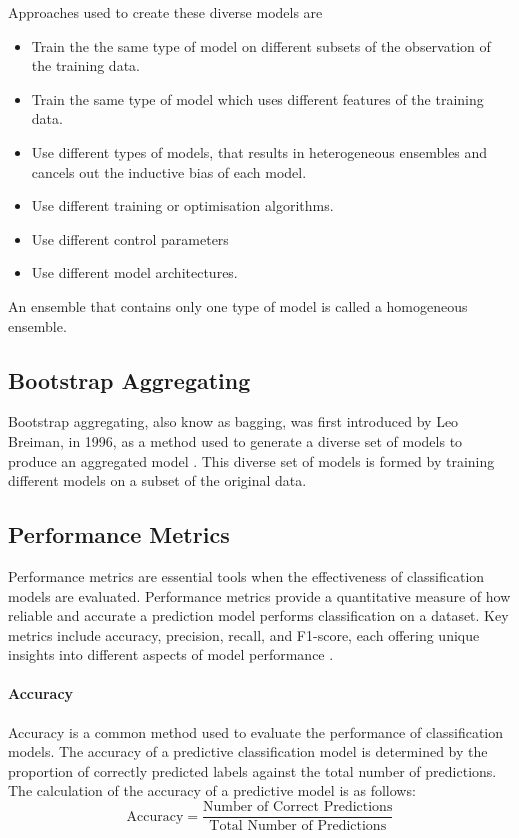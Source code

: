 \documentclass[10pt, conference]{IEEEtran}
\begin{document}
Approaches used to create these diverse models are
\begin{itemize}
    \item Train the the same type of model on different subsets of the observation of the training data.
    \item Train the same type of model which uses different features of the training data.
    \item Use different types of models, that results in heterogeneous ensembles and cancels out the inductive bias of each model.
    \item Use different training or optimisation algorithms.
    \item Use different control parameters
    \item Use different model architectures.
\end{itemize}
An ensemble that contains only one type of model is called a homogeneous ensemble.

\subsection{Bootstrap Aggregating}

Bootstrap aggregating, also know as bagging, was first introduced by Leo Breiman, in 1996, as a method
used to generate a diverse set of models to produce an aggregated model \cite{Bagging_ref}. This diverse
set of models is formed by training different models on a subset of the original data.

\subsection{Performance Metrics} \label{section: Perf_Metrics_background}

Performance metrics are essential tools when the effectiveness of classification models are evaluated. Performance metrics
provide a quantitative measure of how reliable and accurate a prediction model performs classification on a dataset.
Key metrics include accuracy, precision, recall, and F1-score, each offering unique insights into different aspects
of model performance \cite{Performance_ref}.

\paragraph{Accuracy}
Accuracy is a common method used to evaluate the performance of classification models. The accuracy of
a predictive classification model is determined by the proportion of correctly predicted labels against
the total number of predictions. The calculation of the accuracy of a predictive model is as follows:
\begin{equation}
    \text{Accuracy} = \frac{\text{Number of Correct Predictions}}{\text{Total Number of Predictions}} \label{accuracy}
\end{equation}
\end{document}
